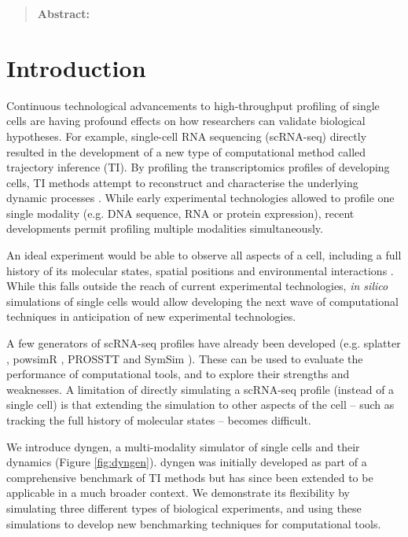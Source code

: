 \begin{quote}
	\textbf{Abstract:} 
\end{quote}

\section{Introduction}
Continuous technological advancements to high-throughput profiling of single cells
are having profound effects on how researchers can validate biological hypotheses. 
For example, single-cell RNA sequencing (scRNA-seq) directly resulted in the development
of a new type of computational method called trajectory inference (TI). By profiling
the transcriptomics profiles of developing cells, TI methods attempt to reconstruct 
and characterise the underlying dynamic processes \cite{cannoodt_computationalmethodstrajectory_2016}.
While early experimental technologies allowed to profile one single modality (e.g. DNA sequence, 
RNA or protein expression), recent developments permit profiling multiple modalities simultaneously.

An ideal experiment would be able to observe all aspects of a cell, including a full history of its 
molecular states, spatial positions and environmental interactions \cite{stuart_integrativesinglecellanalysis_2019}. 
While this falls outside the reach of current experimental technologies, \textit{in silico} simulations
of single cells would allow developing the next wave of computational techniques
in anticipation of new experimental technologies.

A few generators of scRNA-seq profiles have already been developed (e.g. splatter \cite{zappia_splattersimulationsinglecell_2017}, powsimR \cite{vieth_powsimrpoweranalysis_2017}, PROSSTT \cite{papadopoulos_prossttprobabilisticsimulation_2018} and SymSim \cite{zhang_simulatingmultiplefaceted_2019}). These can be used to evaluate the performance of computational tools, and to explore their strengths and weaknesses. A limitation of directly simulating a scRNA-seq profile (instead of a single cell) is that extending the simulation to other aspects of the cell -- such as tracking the full history of molecular states -- becomes difficult.

We introduce dyngen, a multi-modality simulator of single cells and their dynamics (Figure \ref{fig:dyngen}).
dyngen was initially developed as part of a comprehensive benchmark of TI methods \cite{saelens_comparisonsinglecelltrajectory_2019} but has since been extended to be applicable in a much broader context.
We demonstrate its flexibility by simulating three different types of biological experiments, and using these simulations to develop new benchmarking techniques for computational tools.

